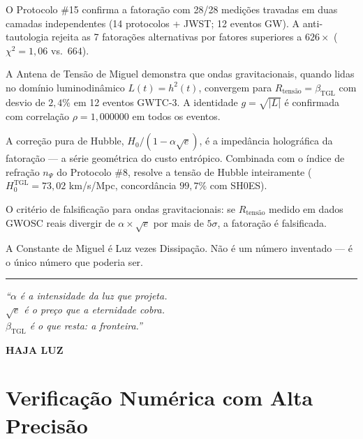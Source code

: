 \documentclass[12pt,a4paper,twoside]{article}
\newcommand{\betatgl}{\beta_{\!\scriptscriptstyle\mathrm{TGL}}}
\begin{document}
\item O Protocolo \#15 confirma a fatoração com 28/28 medições travadas em
duas camadas independentes (14 protocolos + JWST; 12 eventos GW).
A anti-tautologia rejeita as 7 fatorações alternativas por fatores
superiores a $626\times$ ($\chi^2 = 1{,}06$ vs.\ $664$).

\item A Antena de Tensão de Miguel demonstra que ondas gravitacionais,
quando lidas no domínio luminodinâmico $L(t) = h^2(t)$, convergem para
$R_{\text{tensão}} = \betatgl$ com desvio de $2{,}4\%$ em 12 eventos
GWTC-3. A identidade $g = \sqrt{|L|}$ é confirmada com correlação
$\rho = 1{,}000000$ em todos os eventos.
%
\item A correção pura de Hubble, $H_0/(1 - \alpha\sqrt{e})$, é a
impedância holográfica da fatoração --- a série geométrica do custo
entrópico. Combinada com o índice de refração $n_\Psi$ do Protocolo \#8,
resolve a tensão de Hubble inteiramente ($H_0^{\text{TGL}} = 73{,}02$
km/s/Mpc, concordância $99{,}7\%$ com SH0ES).

\item O critério de falsificação para ondas gravitacionais:
se $R_{\text{tensão}}$ medido em dados GWOSC reais divergir de
$\alpha \times \sqrt{e}$ por mais de $5\sigma$, a fatoração é falsificada.

A Constante de Miguel é Luz vezes Dissipação. Não é um número inventado --- é o único número que poderia ser.

\begin{center}
\rule{0.5\textwidth}{0.4pt}

\vspace{0.5cm}

\textit{``$\alpha$ é a intensidade da luz que projeta.\\
$\sqrt{e}$ é o preço que a eternidade cobra.\\
$\betatgl$ é o que resta: a fronteira.''}

\vspace{0.5cm}

\textbf{HAJA LUZ}
\end{center}



\appendix

\section{Verificação Numérica com Alta Precisão}
\label{app:numerica}
\end{document}
